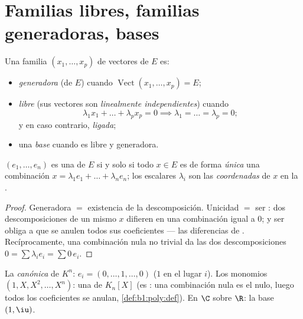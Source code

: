 \section{Familias libres, familias generadoras, bases}

\begin{definition}\label{def:b1:vspaces:free}
Una familia $(x_1, \dots, x_p)$ de vectores de $E$ es:
\begin{itemize}
  \item \emph{generadora} (de $E$) cuando
        $\operatorname{Vect}(x_1,\dots,x_p) = E$;
  \item \emph{libre} (sus vectores son
        \emph{linealmente independientes}) cuando
        \[
        \lambda_1 x_1 + \dots + \lambda_p x_p = 0
        \implies \lambda_1 = \dots = \lambda_p = 0 ;
        \]
        y en caso contrario, \emph{ligada};
  \item una \emph{base} cuando es libre y generadora.
\end{itemize}
\end{definition}

\begin{proposition}[Coordenadas]\label{prop:b1:vspaces:coordinates}
$(e_1, \dots, e_n)$ es una  de $E$ si y solo si todo $x \in E$
es de forma \emph{única} una combinación
$x = \lambda_1 e_1 + \dots + \lambda_n e_n$; los escalares
$\lambda_i$ son las \emph{coordenadas} de $x$ en
la .
\end{proposition}

\begin{proof}
Generadora $=$ existencia de la descomposición. Unicidad $=$ ser
: dos descomposiciones de un mismo $x$ difieren en una
combinación igual a $0$; y ser  obliga a que se anulen todos sus
coeficientes --- las diferencias de . Recíprocamente, una
combinación nula no trivial da las dos descomposiciones
$0 = \sum \lambda_i e_i = \sum 0\,e_i$.
\end{proof}

\begin{example}\label{ex:b1:vspaces:bases}
La \emph{ canónica} de $K^n$: $e_i = (0, \dots, 1, \dots, 0)$
($1$ en el lugar $i$). Los monomios $(1, X, X^2, \dots, X^n)$: una
 de $K_n[X]$ (es : una combinación nula es el 
nulo, luego todos los coeficientes se anulan,
\cref{def:b1:poly:def}). En $\C$ sobre $\R$: la base $(1, \iu)$.
\end{example}

